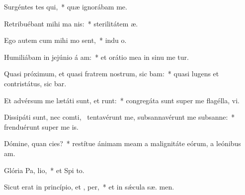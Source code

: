 \item Surgéntes tes qui,~* quæ ignorábam  me.
\item Retribuébant mihi ma  nis:~* sterilitátem  æ.
\item Ego autem cum mihi mo sent,~* indu o.
\item Humiliábam in jejúnio á am:~* et orátio mea in sinu me tur.
\item Quasi próximum, et quasi fratrem nostrum, sic bam:~* quasi lugens et contristátus, sic bar.
\item Et advérsum me lætáti sunt, et runt:~* congregáta sunt super me flagélla,  vi.
\item Dissipáti sunt, nec comti,~\pscross{} tentavérunt me, subsannavérunt me subsanne:~* frenduérunt super me  is.
\item Dómine, quan cies?~* restítue ánimam meam a malignitáte eórum, a leónibus  am.
\item Glória Pa,  lio,~* et Spi to.
\item Sicut erat in princípio, et ,  per,~* et in sǽcula sæ. men.

